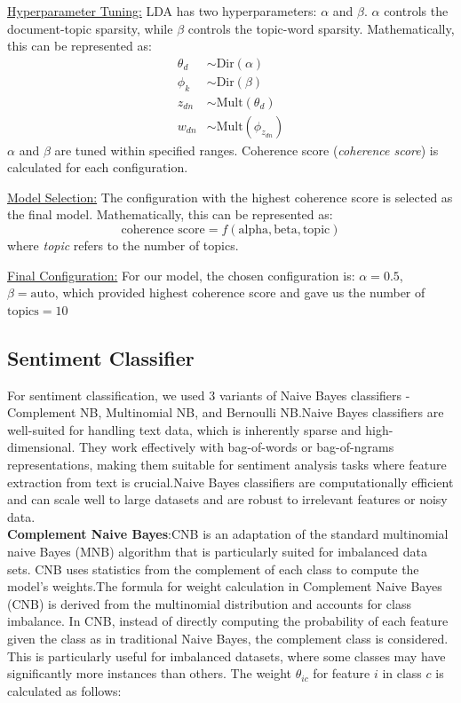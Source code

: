 \documentclass[11pt]{article} %
\begin{document}
\underline{Hyperparameter Tuning:}
LDA has two hyperparameters: $\alpha$ and $\beta$. $\alpha$ controls the document-topic sparsity, while $\beta$ controls the topic-word sparsity. Mathematically, this can be represented as:
\[
\begin{aligned}
\theta_d & \sim \text{Dir}(\alpha) \\
\phi_k & \sim \text{Dir}(\beta) \\
z_{dn} & \sim \text{Mult}(\theta_d) \\
w_{dn} & \sim \text{Mult}(\phi_{z_{dn}})
\end{aligned}
\]
$\alpha$ and $\beta$ are tuned within specified ranges. Coherence score (\textit{coherence score}) is calculated for each configuration.

\underline{Model Selection:}
The configuration with the highest coherence score is selected as the final model. Mathematically, this can be represented as:
\[
\text{coherence score} = f(\text{alpha}, \text{beta}, \text{topic})
\]
where \textit{topic} refers to the number of topics.









\underline{Final Configuration:}
For our model, the chosen configuration is:
$\alpha = 0.5$, $\beta = \text{auto}$, which provided highest coherence score and gave us the number of  $\text{topics} = 10$






\subsection{Sentiment Classifier}
For sentiment classification, we used 3 variants of Naive Bayes classifiers - Complement NB, Multinomial NB, and Bernoulli NB.Naive Bayes classifiers are well-suited for handling text data, which is inherently sparse and high-dimensional. They work effectively with bag-of-words or bag-of-ngrams representations, making them suitable for sentiment analysis tasks where feature extraction from text is crucial.Naive Bayes classifiers are computationally efficient and can scale well to large datasets and are robust to irrelevant features or noisy data.\\
\textbf{Complement Naive Bayes}:CNB is an adaptation of the standard multinomial naive Bayes (MNB) algorithm that is particularly suited for imbalanced data sets. CNB uses statistics from the complement of each class to compute the model’s weights.The formula for weight calculation in Complement Naive Bayes (CNB) is derived from the multinomial distribution and accounts for class imbalance. In CNB, instead of directly computing the probability of each feature given the class as in traditional Naive Bayes, the complement class is considered. This is particularly useful for imbalanced datasets, where some classes may have significantly more instances than others. The weight \( \theta_{ic} \) for feature \( i \) in class \( c \) is calculated as follows:
\end{document}
